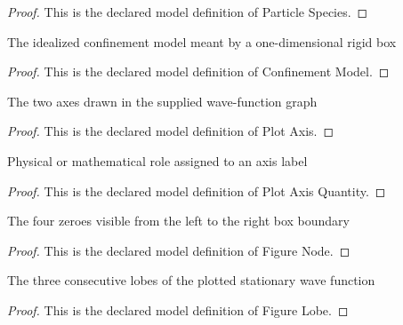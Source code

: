 \begin{proof}
  This is the declared model definition of Particle Species.
\end{proof}
\begin{definition}
  \label{def:physics:phyx-mini-0657:phyxminiproblems-problemphyxmini0657-confinementmodel}
  The idealized confinement model meant by a one-dimensional rigid box
\end{definition}
\begin{proof}
  This is the declared model definition of Confinement Model.
\end{proof}
\begin{definition}
  \label{def:physics:phyx-mini-0657:phyxminiproblems-problemphyxmini0657-plotaxis}
  The two axes drawn in the supplied wave-function graph
\end{definition}
\begin{proof}
  This is the declared model definition of Plot Axis.
\end{proof}
\begin{definition}
  \label{def:physics:phyx-mini-0657:phyxminiproblems-problemphyxmini0657-plotaxisquantity}
  Physical or mathematical role assigned to an axis label
\end{definition}
\begin{proof}
  This is the declared model definition of Plot Axis Quantity.
\end{proof}
\begin{definition}
  \label{def:physics:phyx-mini-0657:phyxminiproblems-problemphyxmini0657-figurenode}
  The four zeroes visible from the left to the right box boundary
\end{definition}
\begin{proof}
  This is the declared model definition of Figure Node.
\end{proof}
\begin{definition}
  \label{def:physics:phyx-mini-0657:phyxminiproblems-problemphyxmini0657-figurelobe}
  The three consecutive lobes of the plotted stationary wave function
\end{definition}
\begin{proof}
  This is the declared model definition of Figure Lobe.
\end{proof}

